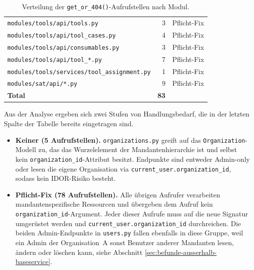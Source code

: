 \begin{table}[H]
\begin{center}
\begin{tabular}{|l|r|l|}
            \hline
            \texttt{modules/tools/api/tools.py}                  & 3                & Pflicht-Fix              \\
            \texttt{modules/tools/api/tool\_cases.py}            & 4                & Pflicht-Fix              \\
            \texttt{modules/tools/api/consumables.py}            & 3                & Pflicht-Fix              \\
            \texttt{modules/tools/api/tool\_*.py}                & 7                & Pflicht-Fix              \\
            \texttt{modules/tools/services/tool\_assignment.py}  & 1                & Pflicht-Fix              \\
            \hline
            \texttt{modules/sat/api/*.py}                        & 9                & Pflicht-Fix              \\
            \hline
            \textbf{Total}                                       & \textbf{83}      &                          \\
            \hline
        \end{tabular}
    \end{center}
    \caption{Verteilung der \texttt{get\_or\_404()}-Aufrufstellen nach Modul.}
    \label{tab:callers_summary}
\end{table}

Aus der Analyse ergeben sich zwei Stufen von Handlungsbedarf, die in
der letzten Spalte der Tabelle bereits eingetragen sind.

\begin{itemize}
    \item \textbf{Keiner (5 Aufrufstellen).} \texttt{organizations.py}
          greift auf das \texttt{Organization}-Modell zu, das das
          Wurzelelement der Mandantenhierarchie ist und selbst kein
          \texttt{organization\_id}-Attribut besitzt. Endpunkte sind
          entweder Admin-only oder lesen die eigene Organisation via
          \texttt{current\_user.\allowbreak organization\_id}, sodass
          kein IDOR-Risiko besteht.

    \item \textbf{Pflicht-Fix (78 Aufrufstellen).} Alle übrigen
          Aufrufer verarbeiten mandantenspezifische Ressourcen und
          übergeben dem Aufruf kein \texttt{organization\_id}-Argument.
          Jeder dieser Aufrufe muss auf die neue Signatur umgerüstet
          werden und
          \texttt{current\_user.\allowbreak organization\_id}
          durchreichen. Die beiden Admin-Endpunkte in
          \texttt{users.py} fallen ebenfalls in diese Gruppe, weil ein
          Admin der Organisation~A sonst Benutzer anderer Mandanten
          lesen, ändern oder löschen kann, siehe Abschnitt
          \ref{sec:befunde-ausserhalb-baseservice}.
\end{itemize}

